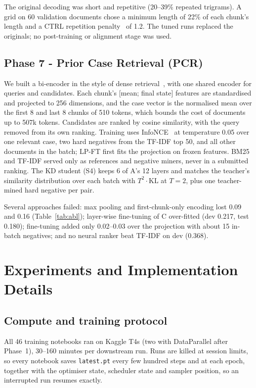 \documentclass[11pt, oneside]{article}
\newcommand{\A}{\textsf{A}}\newcommand{\B}{\textsf{B}}\newcommand{\C}{\textsf{C}}\newcommand{\D}{\textsf{D}}
\begin{document}
The original decoding was short and repetitive (20--39\% repeated trigrams). A grid on 60 validation documents chose a minimum length of 22\% of each chunk's length and a CTRL repetition penalty~\cite{keskar2019ctrl} of 1.2. The tuned runs replaced the originals; no post-training or alignment stage was used.

\subsection{Phase 7 - Prior Case Retrieval (PCR)}
We built a bi-encoder in the style of dense retrieval~\cite{karpukhin2020dpr}, with one shared encoder for queries and candidates. Each chunk's [mean; final state] features are standardised and projected to 256 dimensions, and the case vector is the normalised mean over the first 8 and last 8 chunks of 510 tokens, which bounds the cost of documents up to 507k tokens. Candidates are ranked by cosine similarity, with the query removed from its own ranking. Training uses InfoNCE~\cite{oord2018infonce} at temperature 0.05 over one relevant case, two hard negatives from the TF-IDF top 50, and all other documents in the batch; LP-FT first fits the projection on frozen features. BM25~\cite{robertson2009bm25} and TF-IDF served only as references and negative miners, never in a submitted ranking. The KD student (S4) keeps 6 of \A's 12 layers and matches the teacher's similarity distribution over each batch with $T^2\cdot\mathrm{KL}$ at $T=2$, plus one teacher-mined hard negative per pair.

Several approaches failed: max pooling and first-chunk-only encoding lost 0.09 and 0.16 (Table~\ref{tab:abl}); layer-wise fine-tuning of \C{} over-fitted (dev 0.217, test 0.180); fine-tuning added only 0.02--0.03 over the projection with about 15 in-batch negatives; and no neural ranker beat TF-IDF on dev (0.368).

\section{Experiments and Implementation Details}
\subsection{Compute and training protocol}
All 46 training notebooks ran on Kaggle T4s (two with DataParallel after Phase~1), 30--160 minutes per downstream run. Runs are killed at session limits, so every notebook saves \texttt{latest.pt} every few hundred steps and at each epoch, together with the optimiser state, scheduler state and sampler position, so an interrupted run resumes exactly.
\end{document}
